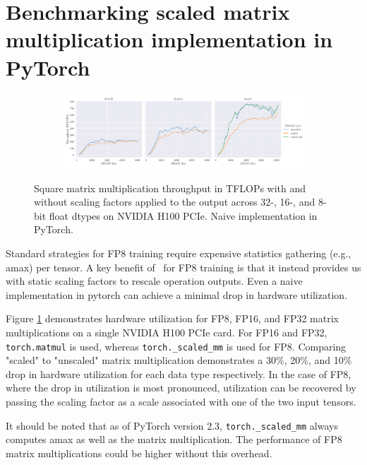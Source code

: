 \section{Benchmarking scaled matrix multiplication implementation in PyTorch} 
\label{app:scaled_mm_benchmarking}

\begin{figure}[!h]
    \centering
    \begin{subfigure}{\textwidth}
        \centering
        \includegraphics[width=\textwidth]{arXiv/figures/scaled-mm-benchmarking.pdf}
    \end{subfigure}
    \caption{Square matrix multiplication throughput in TFLOPs with and without scaling factors applied to the output across 32-, 16-, and 8-bit float dtypes on NVIDIA H100 PCIe. Naive implementation in PyTorch.}
    \label{fig:scaled-mm-benchmarking}
\end{figure}

Standard strategies for FP8 training require expensive statistics gathering (e.g., amax) per tensor. A key benefit of \umup\ for FP8 training is that it instead provides us with static scaling factors to rescale operation outputs. Even a naive implementation in pytorch can achieve a minimal drop in hardware utilization.

Figure \ref{fig:scaled-mm-benchmarking} demonstrates hardware utilization for FP8, FP16, and FP32 matrix multiplications on a single NVIDIA H100 PCIe card. For FP16 and FP32, \texttt{torch.matmul} is used, whereas \texttt{torch.\_scaled\_mm} is used for FP8. Comparing "scaled" to "unscaled" matrix multiplication demonstrates a 30$\%$, 20$\%$, and 10$\%$ drop in hardware utilization for each data type respectively. In the case of FP8, where the drop in utilization is most pronounced, utilization can be recovered by passing the scaling factor as a scale associated with one of the two input tensors.

It should be noted that as of PyTorch version 2.3, \texttt{torch.\_scaled\_mm} always computes amax as well as the matrix multiplication. The performance of FP8 matrix multiplications could be higher without this overhead.
